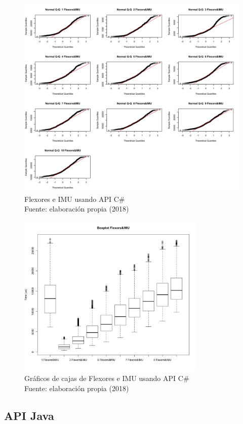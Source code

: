 \begin{figure}[H]
  \begin{center} 
   	\includegraphics[width=1.0\textwidth]{evaluation/graphics/Xamarin/Galaxy-APITest/NormalQQFlexors&IMUXamarinGalaxy-APITest.png} 
   	\centering
    \caption[Gráfico QQ de Flexores e IMU usando API C\# ]{Flexores e IMU usando API C\# \\Fuente: elaboración propia (2018)} 
    \label{fig:xamarin-galaxy-QQ-flexors&imu-api}
  \end{center}
\end{figure}

\begin{figure}[H]
  \begin{center} 
   	\includegraphics[width=0.8\textwidth]{evaluation/graphics/Xamarin/Galaxy-APITest/BoxplotFlexors&IMUXamarinGalaxy-APITest.png} 
   	\centering
    \caption[Gráficos de cajas de Flexores e IMU usando API C\#  ]{Gráficos de cajas de Flexores e IMU usando API C\# \\Fuente: elaboración propia (2018)} 
    \label{fig:xamarin-galaxy-boxplot-flexors&imu-api}
  \end{center}
\end{figure}

\subsection{API Java}
